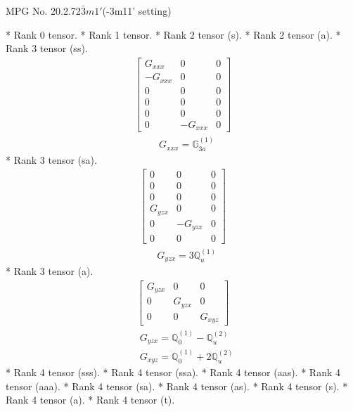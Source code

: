 \documentclass[fleqn,8pt,landscape]{jsarticle}
\begin{document}
\setcounter{MaxMatrixCols}{32}

\renewcommand{\tablename}{Table~}
\renewcommand{\figurename}{Figure~}
\begin{center}
\LARGE
MPG No. 20.2.72\quad$\bar{3}m1'$\quad(-3m11' setting)
\end{center}
* Rank 0 tensor.
* Rank 1 tensor.
* Rank 2 tensor (s).
* Rank 2 tensor (a).
* Rank 3 tensor (ss).
\begin{align*}
\begin{bmatrix} G_{xxx} & 0 & 0 \\ - G_{xxx} & 0 & 0 \\ 0 & 0 & 0 \\ 0 & 0 & 0 \\ 0 & 0 & 0 \\ 0 & - G_{xxx} & 0 \end{bmatrix}
\end{align*}
\begin{align*}
& G_{xxx} = \mathbb{G}_{3a}^{(1)}
\end{align*}
* Rank 3 tensor (sa).
\begin{align*}
\begin{bmatrix} 0 & 0 & 0 \\ 0 & 0 & 0 \\ 0 & 0 & 0 \\ G_{yzx} & 0 & 0 \\ 0 & - G_{yzx} & 0 \\ 0 & 0 & 0 \end{bmatrix}
\end{align*}
\begin{align*}
& G_{yzx} = 3 \mathbb{Q}_{u}^{(1)}
\end{align*}
* Rank 3 tensor (a).
\begin{align*}
\begin{bmatrix} G_{yzx} & 0 & 0 \\ 0 & G_{yzx} & 0 \\ 0 & 0 & G_{xyz} \end{bmatrix}
\end{align*}
\begin{align*}
& G_{yzx} = \mathbb{Q}_{0}^{(1)} - \mathbb{Q}_{u}^{(2)} \\
& G_{xyz} = \mathbb{Q}_{0}^{(1)} + 2 \mathbb{Q}_{u}^{(2)}
\end{align*}
* Rank 4 tensor (sss).
* Rank 4 tensor (ssa).
* Rank 4 tensor (aas).
* Rank 4 tensor (aaa).
* Rank 4 tensor (sa).
* Rank 4 tensor (as).
* Rank 4 tensor (s).
* Rank 4 tensor (a).
* Rank 4 tensor (t).
\end{document}
